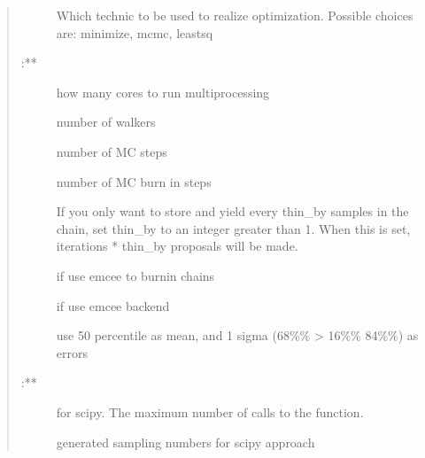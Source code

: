 \documentclass[letterpaper,10pt,english]{sphinxmanual}
\begin{document}
\begin{fulllineitems}
\begin{fulllineitems}
\begin{quote}
\begin{description}
\begin{description}
\item[{}] \leavevmode
Which technic to be used to realize optimization. Possible choices are: minimize, mcmc, leastsq

\item[{ :**}] \leavevmode
\item[{}] \leavevmode{[}\sphinxtitleref{int}{]}
how many cores to run multi\sphinxhyphen{}processing

\item[{}] \leavevmode{[}\sphinxtitleref{int}{]}
number of walkers

\item[{}] \leavevmode{[}\sphinxtitleref{int}{]}
number of MC steps

\item[{}] \leavevmode{[}\sphinxtitleref{int}{]}
number of MC burn in steps

\item[{}] \leavevmode{[}\sphinxtitleref{int}{]}
If you only want to store and yield every thin\_by samples in the chain, set thin\_by to an integer greater than 1. When this is set, iterations * thin\_by proposals will be made.

\item[{}] \leavevmode{[}\sphinxtitleref{bool}{]}
if use emcee to burnin chains

\item[{}] \leavevmode{[}\sphinxtitleref{bool}{]}
if use emcee backend

\item[{}] \leavevmode{[}\sphinxtitleref{list}{]}
use 50 percentile as mean, and 1 sigma (68\%\% \sphinxhyphen{}\textgreater{} 16\%\% \sphinxhyphen{} 84\%\%) as errors

\item[{ :**}] \leavevmode
\item[{}] \leavevmode{[}\sphinxtitleref{int}{]}
for scipy. The maximum number of calls to the function.

\item[{}] \leavevmode{[}\sphinxtitleref{int}{]}
generated sampling numbers for scipy approach


\end{description}
\end{description}
\end{quote}
\end{fulllineitems}
\end{fulllineitems}
\end{document}
